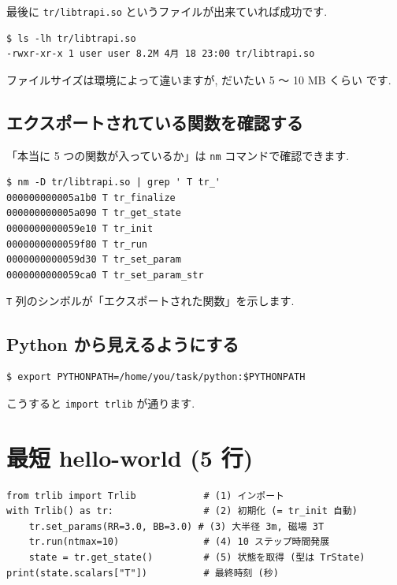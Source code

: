 \documentclass[11pt,a4paper]{report}
\begin{document}
最後に \texttt{tr/libtrapi.so} というファイルが出来ていれば成功です.

\begin{lstlisting}[style=bash]
$ ls -lh tr/libtrapi.so
-rwxr-xr-x 1 user user 8.2M 4月 18 23:00 tr/libtrapi.so
\end{lstlisting}

ファイルサイズは環境によって違いますが, だいたい 5 〜 10 MB くらい
です.

\subsection{エクスポートされている関数を確認する}

「本当に 5 つの関数が入っているか」は \texttt{nm} コマンドで確認できます.

\begin{lstlisting}[style=bash]
$ nm -D tr/libtrapi.so | grep ' T tr_'
000000000005a1b0 T tr_finalize
000000000005a090 T tr_get_state
0000000000059e10 T tr_init
0000000000059f80 T tr_run
0000000000059d30 T tr_set_param
0000000000059ca0 T tr_set_param_str
\end{lstlisting}

\texttt{T} 列のシンボルが「エクスポートされた関数」を示します.

\subsection{Python から見えるようにする}

\begin{lstlisting}[style=bash]
$ export PYTHONPATH=/home/you/task/python:$PYTHONPATH
\end{lstlisting}

こうすると \texttt{import trlib} が通ります.

\section{最短 hello-world (5 行)}

\begin{lstlisting}[style=py,caption={\texttt{trlib} 最小例}]
from trlib import Trlib            # (1) インポート
with Trlib() as tr:                # (2) 初期化 (= tr_init 自動)
    tr.set_params(RR=3.0, BB=3.0) # (3) 大半径 3m, 磁場 3T
    tr.run(ntmax=10)               # (4) 10 ステップ時間発展
    state = tr.get_state()         # (5) 状態を取得 (型は TrState)
print(state.scalars["T"])          # 最終時刻 (秒)
\end{lstlisting}
\end{document}
